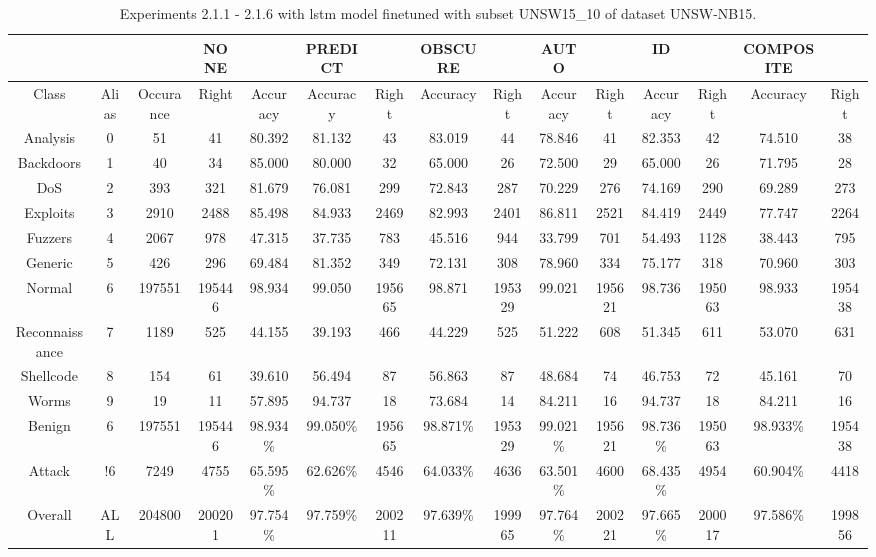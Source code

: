 \begin{table}[htb]
    \centering
    \caption{Experiments 2.1.1 - 2.1.6 with \gls{lstm} model finetuned with subset UNSW15\_10 of dataset UNSW-NB15.}
    \label{table:results:lstm:flows15_subset}
    \begin{tabular}{@{}ccccccccccccccc@{}}
        \toprule
         &  &  & NONE &  & PREDICT &  & OBSCURE &  & AUTO &  & ID &  & COMPOSITE &  \\
        \midrule
        Class &  Alias &  Occurance &  Right &  Accuracy &  Accuracy &  Right &  Accuracy &  Right &  Accuracy &  Right &  Accuracy &  Right &  Accuracy &  Right \\
        Analysis &  0 &  51 &  41 &  80.392 &  81.132 &  43 &  83.019 &  44 &  78.846 &  41 &  82.353 &  42 &  74.510 &  38 \\
        Backdoors &  1 &  40 &  34 &  85.000 &  80.000 &  32 &  65.000 &  26 &  72.500 &  29 &  65.000 &  26 &  71.795 &  28 \\
        DoS &  2 &  393 &  321 &  81.679 &  76.081 &  299 &  72.843 &  287 &  70.229 &  276 &  74.169 &  290 &  69.289 &  273 \\
        Exploits &  3 &  2910 &  2488 &  85.498 &  84.933 &  2469 &  82.993 &  2401 &  86.811 &  2521 &  84.419 &  2449 &  77.747 &  2264 \\
        Fuzzers &  4 &  2067 &  978 &  47.315 &  37.735 &  783 &  45.516 &  944 &  33.799 &  701 &  54.493 &  1128 &  38.443 &  795 \\
        Generic &  5 &  426 &  296 &  69.484 &  81.352 &  349 &  72.131 &  308 &  78.960 &  334 &  75.177 &  318 &  70.960 &  303 \\
        Normal &  6 &  197551 &  195446 &  98.934 &  99.050 &  195665 &  98.871 &  195329 &  99.021 &  195621 &  98.736 &  195063 &  98.933 &  195438 \\
        Reconnaissance &  7 &  1189 &  525 &  44.155 &  39.193 &  466 &  44.229 &  525 &  51.222 &  608 &  51.345 &  611 &  53.070 &  631 \\
        Shellcode &  8 &  154 &  61 &  39.610 &  56.494 &  87 &  56.863 &  87 &  48.684 &  74 &  46.753 &  72 &  45.161 &  70 \\
        Worms &  9 &  19 &  11 &  57.895 &  94.737 &  18 &  73.684 &  14 &  84.211 &  16 &  94.737 &  18 &  84.211 &  16 \\
        Benign &  6 &  197551 &  195446 &  98.934\% &  99.050\% &  195665 &  98.871\% &  195329 &  99.021\% &  195621 &  98.736\% &  195063 &  98.933\% &  195438 \\
        Attack &  !6 &  7249 &  4755 &  65.595\% &  62.626\% &  4546 &  64.033\% &  4636 &  63.501\% &  4600 &  68.435\% &  4954 &  60.904\% &  4418 \\
        Overall &  ALL &  204800 &  200201 &  97.754\% &  97.759\% &  200211 &  97.639\% &  199965 &  97.764\% &  200221 &  97.665\% &  200017 &  97.586\% &  199856 \\
        \bottomrule
    \end{tabular}
\end{table}
